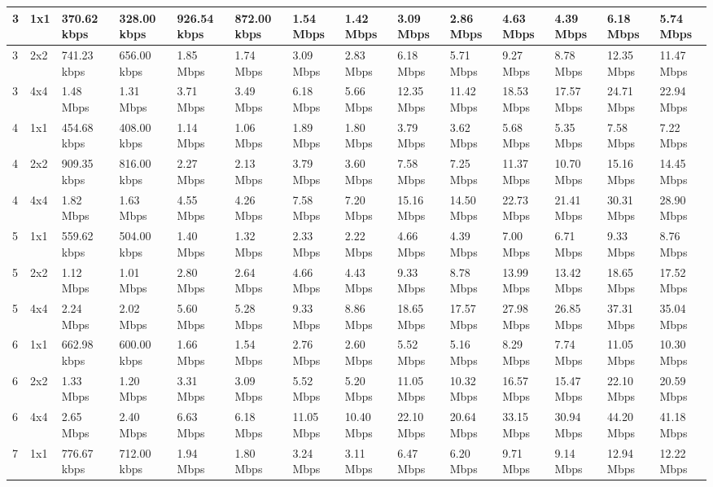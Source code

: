 \documentclass[12pt]{article}
\begin{document}
\begin{longtable}[c]{|l|l|l|l|l|l|l|l|l|l|l|l|l|l|}
3 & 1x1 & 370.62 kbps & 328.00 kbps & 926.54 kbps & 872.00 kbps & 1.54 Mbps & 1.42 Mbps & 3.09 Mbps & 2.86 Mbps & 4.63 Mbps & 4.39 Mbps & 6.18 Mbps & 5.74 Mbps \\ \hline
3 & 2x2 & 741.23 kbps & 656.00 kbps & 1.85 Mbps & 1.74 Mbps & 3.09 Mbps & 2.83 Mbps & 6.18 Mbps & 5.71 Mbps & 9.27 Mbps & 8.78 Mbps & 12.35 Mbps & 11.47 Mbps \\ \hline
3 & 4x4 & 1.48 Mbps & 1.31 Mbps & 3.71 Mbps & 3.49 Mbps & 6.18 Mbps & 5.66 Mbps & 12.35 Mbps & 11.42 Mbps & 18.53 Mbps & 17.57 Mbps & 24.71 Mbps & 22.94 Mbps \\ \hline
4 & 1x1 & 454.68 kbps & 408.00 kbps & 1.14 Mbps & 1.06 Mbps & 1.89 Mbps & 1.80 Mbps & 3.79 Mbps & 3.62 Mbps & 5.68 Mbps & 5.35 Mbps & 7.58 Mbps & 7.22 Mbps \\ \hline
4 & 2x2 & 909.35 kbps & 816.00 kbps & 2.27 Mbps & 2.13 Mbps & 3.79 Mbps & 3.60 Mbps & 7.58 Mbps & 7.25 Mbps & 11.37 Mbps & 10.70 Mbps & 15.16 Mbps & 14.45 Mbps \\ \hline
4 & 4x4 & 1.82 Mbps & 1.63 Mbps & 4.55 Mbps & 4.26 Mbps & 7.58 Mbps & 7.20 Mbps & 15.16 Mbps & 14.50 Mbps & 22.73 Mbps & 21.41 Mbps & 30.31 Mbps & 28.90 Mbps \\ \hline
5 & 1x1 & 559.62 kbps & 504.00 kbps & 1.40 Mbps & 1.32 Mbps & 2.33 Mbps & 2.22 Mbps & 4.66 Mbps & 4.39 Mbps & 7.00 Mbps & 6.71 Mbps & 9.33 Mbps & 8.76 Mbps \\ \hline
5 & 2x2 & 1.12 Mbps & 1.01 Mbps & 2.80 Mbps & 2.64 Mbps & 4.66 Mbps & 4.43 Mbps & 9.33 Mbps & 8.78 Mbps & 13.99 Mbps & 13.42 Mbps & 18.65 Mbps & 17.52 Mbps \\ \hline
5 & 4x4 & 2.24 Mbps & 2.02 Mbps & 5.60 Mbps & 5.28 Mbps & 9.33 Mbps & 8.86 Mbps & 18.65 Mbps & 17.57 Mbps & 27.98 Mbps & 26.85 Mbps & 37.31 Mbps & 35.04 Mbps \\ \hline
6 & 1x1 & 662.98 kbps & 600.00 kbps & 1.66 Mbps & 1.54 Mbps & 2.76 Mbps & 2.60 Mbps & 5.52 Mbps & 5.16 Mbps & 8.29 Mbps & 7.74 Mbps & 11.05 Mbps & 10.30 Mbps \\ \hline
6 & 2x2 & 1.33 Mbps & 1.20 Mbps & 3.31 Mbps & 3.09 Mbps & 5.52 Mbps & 5.20 Mbps & 11.05 Mbps & 10.32 Mbps & 16.57 Mbps & 15.47 Mbps & 22.10 Mbps & 20.59 Mbps \\ \hline
6 & 4x4 & 2.65 Mbps & 2.40 Mbps & 6.63 Mbps & 6.18 Mbps & 11.05 Mbps & 10.40 Mbps & 22.10 Mbps & 20.64 Mbps & 33.15 Mbps & 30.94 Mbps & 44.20 Mbps & 41.18 Mbps \\ \hline
7 & 1x1 & 776.67 kbps & 712.00 kbps & 1.94 Mbps & 1.80 Mbps & 3.24 Mbps & 3.11 Mbps & 6.47 Mbps & 6.20 Mbps & 9.71 Mbps & 9.14 Mbps & 12.94 Mbps & 12.22 Mbps \\ \hline

\end{longtable}
\end{document}
